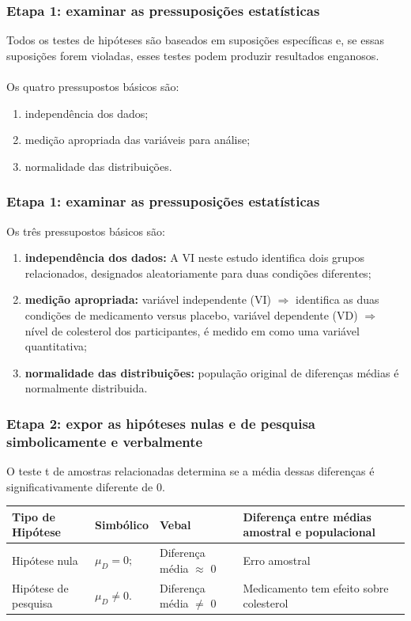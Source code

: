\documentclass[11pt]{beamer}
\begin{document}
\begin{frame}
\frametitle{Etapa 1: examinar as pressuposições estatísticas}

Todos os testes de hipóteses são baseados em suposições específicas e, se essas suposições forem violadas, esses testes podem produzir resultados enganosos.\\~\\
Os quatro pressupostos básicos são:

\begin{enumerate}
\item independência dos dados;
\item medição apropriada das variáveis para análise;
\item normalidade das distribuições.
\end{enumerate}

\end{frame}

\begin{frame}
\frametitle{Etapa 1: examinar as pressuposições estatísticas}

Os três pressupostos básicos são:

\begin{enumerate}
\item \textbf{independência dos dados:} A VI neste estudo identifica dois grupos relacionados, designados aleatoriamente para duas condições diferentes;
\item \textbf{medição apropriada:} variável independente (VI) \(\Rightarrow\) identifica as duas condições de medicamento versus placebo, variável dependente (VD) \(\Rightarrow\) nível de colesterol dos participantes, é medido em como uma variável quantitativa;
\item \textbf{normalidade das distribuições:} população original de diferenças médias é normalmente distribuida.
\end{enumerate}

\end{frame}

\begin{frame}
\frametitle{Etapa 2: expor as hipóteses nulas e de pesquisa simbolicamente e verbalmente}

O teste t de amostras relacionadas determina se a média dessas diferenças é significativamente diferente de 0.

\begin{center}
\begin{tabular}{ m{2cm}|m{2cm}|m{3cm}|m{3cm} } 
 \hline
 Tipo de Hipótese & Simbólico & Vebal & Diferença entre médias amostral e populacional\\
  \hline
 Hipótese nula & $\mu_{D}=0;$ & Diferença média $\approx$ 0 & Erro amostral \\ 
 Hipótese de pesquisa & $\mu_{D} \neq 0.$ & Diferença média $\neq$ 0 & Medicamento tem efeito sobre colesterol  \\ 
 \hline
 \hline
\end{tabular}
\end{center}

\end{frame}
\end{document}
